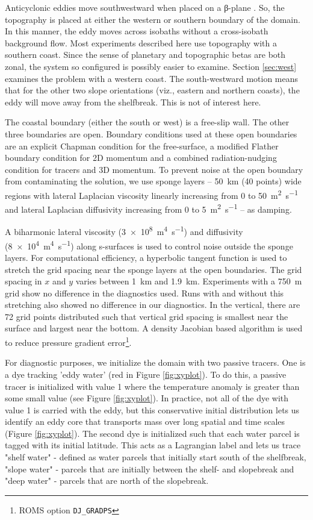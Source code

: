 Anticyclonic eddies move southwestward when placed on a β-plane \citep{McWilliams1979, Nof1983, Early2011}. So, the topography is placed at either the western or southern boundary of the domain. In this manner, the eddy moves across isobaths without a cross-isobath background flow. Most experiments described here use topography with a southern coast. Since the sense of planetary and topographic betas are both zonal, the system so configured is possibly easier to examine. Section \ref{sec:west} examines the problem with a western coast. The south-westward motion means that for the other two slope orientations (viz., eastern and northern coasts), the eddy will move away from the shelfbreak. This is not of interest here.

The coastal boundary (either the south or west) is a free-slip wall. The other three boundaries are open. Boundary conditions used at these open boundaries are an explicit Chapman condition for the free-surface, a modified Flather boundary condition \citep{Mason2010} for 2D momentum and a combined radiation-nudging \citep{Marchesiello2001} condition for tracers and 3D momentum. To prevent noise at the open boundary from contaminating the solution, we use sponge layers -- \SI{50}{km} (40 points) wide regions with lateral Laplacian viscosity linearly increasing from 0 to \SI{50}{\square\metre\per\second} and lateral Laplacian diffusivity increasing from 0 to \SI{5}{\square\metre\per\second} -- as damping.

A biharmonic lateral viscosity (\SI{3e8}{\metre^4\per\second}) and diffusivity (\SI{8e4}{\metre^4\per\second}) along s-surfaces is used to control noise outside the sponge layers. For computational efficiency, a hyperbolic tangent function is used to stretch the grid spacing near the sponge layers at the open boundaries. The grid spacing in $x$ and $y$ varies between \SI{1}{km} and \SI{1.9}{km}. Experiments with a \SI{750}{m} grid show no difference in the diagnostics used.  Runs with and without this stretching also showed no difference in our diagnostics. In the vertical, there are 72 grid points distributed such that vertical grid spacing is smallest near the surface and largest near the bottom. A density Jacobian based algorithm \citep{Shchepetkin2003} is used to reduce pressure gradient error\footnote{ROMS option \texttt{DJ\_GRADPS}}.

For diagnostic purposes, we initialize the domain with two passive tracers. One is a dye tracking 'eddy water' (red in Figure \ref{fig:xyplot}). To do this, a passive tracer is initialized with value 1 where the temperature anomaly is greater than some small value (see Figure \ref{fig:xyplot}). In practice, not all of the dye with value 1 is carried with the eddy, but this conservative initial distribution lets us identify an eddy core that transports mass over long spatial and time scales (Figure \ref{fig:xyplot}). The second dye is initialized such that each water parcel is tagged with its initial latitude. This acts as a Lagrangian label \citep{Cervantes2004} and lets us trace "shelf water" - defined as water parcels that initially start south of the shelfbreak, "slope water" - parcels that are initially between the shelf- and slopebreak and "deep water" - parcels that are north of the slopebreak.
